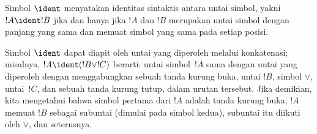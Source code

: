 \documentclass[../../../include/open-logic-section]{subfiles}
\begin{document}
\begin{defn}
Simbol $\ident$ menyatakan identitas sintaktis antara untai simbol, yakni
$!A \ident !B$ jika dan hanya jika $!A$ dan $!B$ merupakan untai simbol
dengan panjang yang sama dan memuat simbol yang sama pada setiap posisi.
\end{defn}

Simbol $\ident$ dapat diapit oleh untai yang diperoleh melalui konkatenasi;
misalnya, $!A \ident (!B \lor !C)$ berarti: untai simbol~$!A$ sama dengan
untai yang diperoleh dengan menggabungkan sebuah tanda kurung buka, untai
$!B$, simbol $\lor$, untai~$!C$, dan sebuah tanda kurung tutup, dalam urutan
tersebut. Jika demikian, kita mengetahui bahwa simbol pertama dari $!A$
adalah tanda kurung buka, $!A$ memuat $!B$ sebagai subuntai (dimulai pada
simbol kedua), subuntai itu diikuti oleh $\lor$, dan seterusnya.
\end{document}
